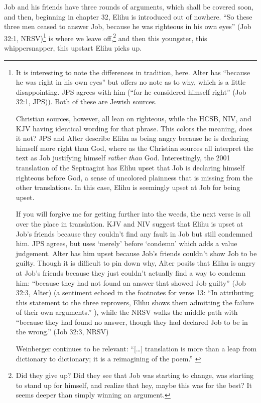 Job and his friends have three rounds of arguments, which shall be covered soon, and then, beginning in chapter 32, Elihu is introduced out of nowhere. ``So these three men ceased to answer Job, because he was righteous in his own eyes'' (Job 32:1, NRSV)\footnote{It is interesting to note the differences in tradition, here. Alter has ``because he was right in his own eyes'' but offers no note as to why, which is a little disappointing. JPS agrees with him (``for he considered himself right'' (Job 32:1, JPS)). Both of these are Jewish sources.

Christian sources, however, all lean on righteous, while the HCSB, NIV, and KJV having identical wording for that phrase. This colors the meaning, does it not? JPS and Alter describe Elihu as being angry because he is declaring himself more right than God, where as the Christian sources all interpret the text as Job justifying himself \emph{rather than} God. Interestingly, the 2001 translation of the Septuagint has Elihu upset that Job is declaring himself righteous before God, a sense of uncolored plainness that is missing from the other translations. In this case, Elihu is seemingly upset at Job for being upset.\footnotemark

If you will forgive me for getting further into the weeds, the next verse is all over the place in translation. KJV and NIV suggest that Elihu is upset at Job's friends because they couldn't find any fault in Job but still condemned him. JPS agrees, but uses `merely' before `condemn' which adds a value judgement. Alter has him upset because Job's friends couldn't show Job to be guilty. Though it is difficult to pin down why, Alter posits that Elihu is angry at Job's friends because they just couldn't actually find a way to condemn him: ``because they had not found an answer that showed Job guilty'' (Job 32:3, Alter) (a sentiment echoed in the footnotes for verse 13: ``In attributing this statement to the three reprovers, Elihu shows them admitting the failure of their own arguments.'' \parencite[548]{alter}), while the NRSV walks the middle path with ``because they had found no answer, though they had declared Job to be in the wrong.'' (Job 32:3, NRSV)

Weinberger continues to be relevant: ``{[}\ldots{]} translation is more than a leap from dictionary to dictionary; it is a reimagining of the poem.'' \parencite[46]{wangwei}} is where we leave off,\footnote{Did they give up? Did they see that Job was starting to change, was starting to stand up for himself, and realize that hey, maybe this was for the best? It seems deeper than simply winning an argument.} and then this youngster, this whippersnapper, this upstart Elihu picks up.

